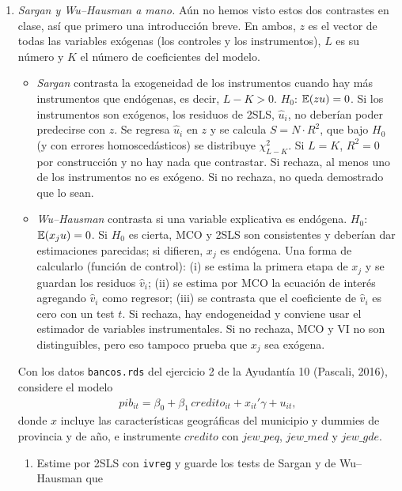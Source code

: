 \documentclass[letterpaper,11pt]{article}
\begin{document}
\begin{enumerate}[itemsep=0.8em]
\item \emph{Sargan y Wu--Hausman a mano.} Aún no hemos visto estos dos contrastes en clase,
    así que primero una introducción breve. En ambos, $z$ es el vector de todas las variables
    exógenas (los controles y los instrumentos), $L$ es su número y $K$ el número de coeficientes
    del modelo.
    \begin{itemize}
        \item \emph{Sargan} contrasta la exogeneidad de los instrumentos cuando hay más
            instrumentos que endógenas, es decir, $L-K>0$. $H_0$: $\operatorname{\mathbb{E}}(zu)=0$. Si los instrumentos
            son exógenos, los residuos de 2SLS, $\hat u_i$, no deberían poder predecirse con $z$.
            Se regresa $\hat u_i$ en $z$ y se calcula $S=N\cdot R^2$, que bajo $H_0$ (y con
            errores homoscedásticos) se distribuye $\chi^2_{L-K}$. Si $L=K$, $R^2=0$ por
            construcción y no hay nada que contrastar. Si rechaza, al menos uno de los
            instrumentos no es exógeno. Si no rechaza, no queda demostrado que lo sean.
        \item \emph{Wu--Hausman} contrasta si una variable explicativa es endógena.
            $H_0$: $\operatorname{\mathbb{E}}(x_ju)=0$. Si $H_0$ es cierta, MCO y 2SLS son consistentes y deberían dar
            estimaciones parecidas; si difieren, $x_j$ es endógena. Una forma de calcularlo
            (función de control): (i) se estima la primera etapa de $x_j$ y se guardan los
            residuos $\hat v_i$; (ii) se estima por MCO la ecuación de interés agregando
            $\hat v_i$ como regresor; (iii) se contrasta que el coeficiente de $\hat v_i$ es
            cero con un test $t$. Si rechaza, hay endogeneidad y conviene usar el estimador de
            variables instrumentales. Si no rechaza, MCO y VI no son distinguibles, pero eso
            tampoco prueba que $x_j$ sea exógena.
    \end{itemize}
    Con los datos \texttt{bancos.rds} del ejercicio 2 de la
    Ayudantía 10 (Pascali, 2016), considere el modelo
    \begin{align*}
    pib_{it}=\beta_0+\beta_1\, credito_{it}+x_{it}'\gamma+u_{it},
    \end{align*}
    donde $x$ incluye las características geográficas del municipio y dummies de provincia y de
    año, e instrumente $credito$ con $jew\_peq$, $jew\_med$ y $jew\_gde$.
    \begin{enumerate}
        \item Estime por 2SLS con \texttt{ivreg} y guarde los tests de Sargan y de Wu--Hausman que

\end{enumerate}
\end{enumerate}
\end{document}
